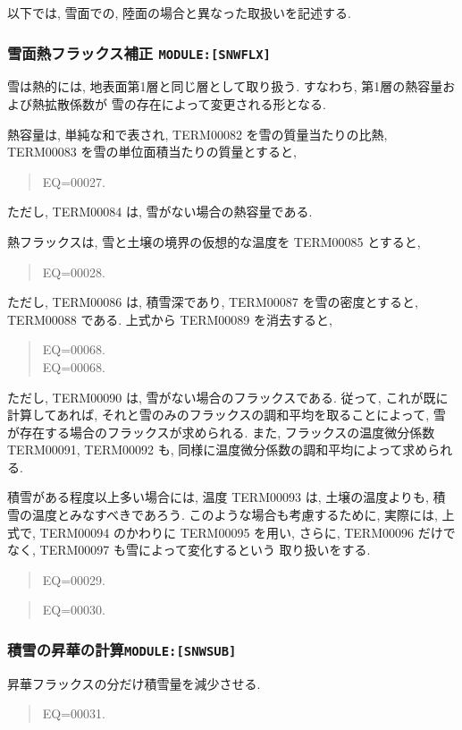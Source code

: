 \bigskip
以下では, 雪面での, 陸面の場合と異なった取扱いを記述する.
\bigskip

\subsubsection{雪面熱フラックス補正 \texttt{MODULE:[SNWFLX]}}


雪は熱的には, 地表面第1層と同じ層として取り扱う.
すなわち, 第1層の熱容量および熱拡散係数が
雪の存在によって変更される形となる.

熱容量は, 単純な和で表され,
TERM00082 を雪の質量当たりの比熱, TERM00083 を雪の単位面積当たりの質量とすると,
\begin{quote}
EQ=00027.
\end{quote}
ただし, TERM00084 は, 雪がない場合の熱容量である.

熱フラックスは, 雪と土壌の境界の仮想的な温度を TERM00085 とすると,
\begin{quote}
EQ=00028.
\end{quote}
ただし, TERM00086 は, 積雪深であり, 
TERM00087 を雪の密度とすると, TERM00088 である.
上式から TERM00089 を消去すると,
\begin{quote}
\nonumber
EQ=00068.\\
EQ=00068.
\end{quote}
ただし, TERM00090 は, 雪がない場合のフラックスである.
従って, これが既に計算してあれば,
それと雪のみのフラックスの調和平均を取ることによって,
雪が存在する場合のフラックスが求められる.
また, フラックスの温度微分係数 TERM00091, TERM00092
も, 同様に温度微分係数の調和平均によって求められる.

積雪がある程度以上多い場合には, 
温度 TERM00093 は, 土壌の温度よりも, 積雪の温度とみなすべきであろう.
このような場合も考慮するために, 実際には, 
上式で, TERM00094 のかわりに TERM00095 を用い, 
さらに, TERM00096 だけでなく, TERM00097 も雪によって変化するという
取り扱いをする.

\begin{quote}
EQ=00029.
\end{quote}
\begin{quote}
EQ=00030.
\end{quote}

\subsubsection{積雪の昇華の計算\texttt{MODULE:[SNWSUB]}}

昇華フラックスの分だけ積雪量を減少させる. 
\begin{quote}
EQ=00031.
\end{quote}

